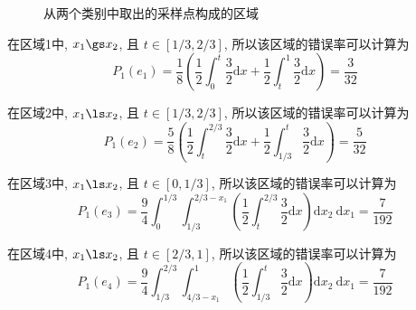 \documentclass[openany]{ctexbook}
\theoremstyle{kaiti}
\theoremstyle{normal}
\begin{document}
\begin{figure}
  \centering
  \caption{从两个类别中取出的采样点构成的区域}
  \label{fig:sampleRange}
\end{figure}

在区域1中, $x_1\gs x_2$, 且 $t\in[1/3,2/3]$, 所以该区域的错误率可以计算为
\begin{equation}
  P_1(e_1)=\frac{1}{8}\left(\frac{1}{2}\int_{0}^t\frac{3}{2}\mathrm{d}x+\frac{1}{2}\int_t^{1}\frac{3}{2}\mathrm{d}x\right)=\frac{3}{32}
\end{equation}

在区域2中, $x_1\ls x_2$, 且 $t\in[1/3,2/3]$, 所以该区域的错误率可以计算为
\begin{equation}
  P_1(e_2)=\frac{5}{8}\left(\frac{1}{2}\int_{t}^{2/3}\frac{3}{2}\mathrm{d}x+\frac{1}{2}\int_{1/3}^{t}\frac{3}{2}\mathrm{d}x\right)=\frac{5}{32}
\end{equation}

在区域3中, $x_1\ls x_2$, 且 $t\in[0,1/3]$, 所以该区域的错误率可以计算为
\begin{equation}
  P_1(e_3)=\frac{9}{4}\int_0^{1/3}\int_{1/3}^{2/3-x_1}\left(\frac{1}{2}\int_t^{2/3}\frac{3}{2}\mathrm{d}x\right)\mathrm{d}x_2~\mathrm{d}x_1=\frac{7}{192}
\end{equation}

在区域4中, $x_1\ls x_2$, 且 $t\in[2/3,1]$, 所以该区域的错误率可以计算为
\begin{equation}
  P_1(e_4)=\frac{9}{4}\int_{1/3}^{2/3}\int_{4/3-x_1}^{1}\left(\frac{1}{2}\int_{1/3}^{t}\frac{3}{2}\mathrm{d}x\right)\mathrm{d}x_2~\mathrm{d}x_1=\frac{7}{192}
\end{equation}
\end{document}
